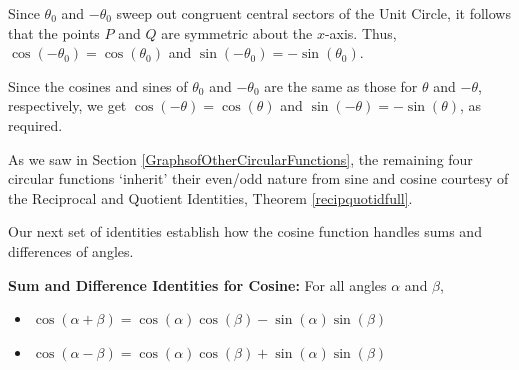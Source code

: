 \documentclass{ximera}
\begin{document}
\begin{image}

\end{image}

Since $\theta_0$ and $-\theta_0$ sweep out congruent central sectors of the Unit Circle, it follows that the points $P$ and $Q$ are symmetric about the $x$-axis.  Thus, $\cos(-\theta_0) = \cos(\theta_0)$ and $\sin(-\theta_0) = -\sin(\theta_0)$. 

 

Since the cosines and sines of $\theta_0$ and $-\theta_0$ are the same as those for $\theta$ and $-\theta$, respectively, we get $\cos(-\theta) = \cos(\theta)$ and $\sin(-\theta) = -\sin(\theta)$, as required. 

 

As we saw in Section \ref{GraphsofOtherCircularFunctions}, the remaining four circular functions `inherit' their even/odd nature from sine and cosine courtesy of the Reciprocal and Quotient Identities, Theorem \ref{recipquotidfull}.  

 

Our next set of identities establish how the cosine function handles sums and differences of angles.

 


\begin{theorem} \label{cosinesumdifference}  \textbf{Sum and Difference Identities for Cosine:} For all angles $\alpha$ and $\beta$,  

\begin{itemize}

\item  $\cos(\alpha + \beta) = \cos(\alpha) \cos(\beta) - \sin(\alpha) \sin(\beta)$

\item $\cos(\alpha - \beta) = \cos(\alpha) \cos(\beta) + \sin(\alpha) \sin(\beta)$

\end{itemize}

\end{theorem}
\end{document}
